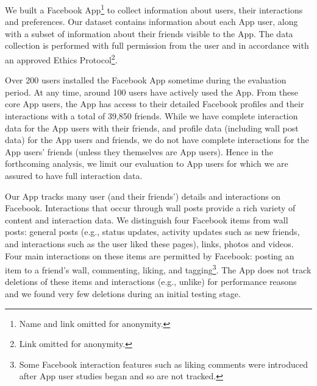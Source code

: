 
We built a Facebook App\footnote{Name and link omitted
for anonymity.} to collect information about users, 
their interactions and preferences.  
Our dataset contains information about each App user, along with a
subset of information about their friends visible to the App.  The
data collection is performed with full permission from the user and in
accordance with an approved Ethics Protocol\footnote{Link omitted for
anonymity.}.

Over 200 users installed the Facebook App sometime during the
evaluation period. At any time, around 100 users have actively used
the App. From these core App users, the App has access to their
detailed Facebook profiles and their interactions with a total of
39,850 friends.
While we have complete interaction data for the App
users with their friends, and profile data (including
wall post data) for the App users and friends, we do not have complete
interactions for the App users' friends (unless they themselves are
App users).  Hence in the forthcoming analysis, we limit our
evaluation to App users for which we are assured to have full
interaction data.

Our App tracks many user (and their friends') details and interactions
on Facebook.  Interactions that occur through wall posts provide a
rich variety of content and interaction data.  We distinguish four
Facebook items from wall posts: general posts (e.g., status updates,
activity updates such as new friends, and interactions such as the
user liked these pages), links, photos and videos. Four main
interactions on these items are permitted by Facebook: posting an item
to a friend's wall, commenting, liking, and tagging\footnote{Some
Facebook interaction features such as liking comments were introduced
after App user studies began and so are not tracked.}.  The App does
not track deletions of these items and interactions (e.g., unlike) for
performance reasons and we found very few deletions during an initial
testing stage.



